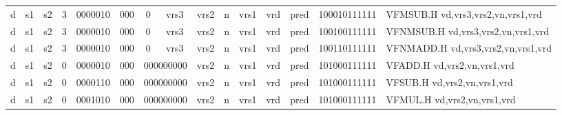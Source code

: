 \begin{landscape}
\begin{table}[p]
\begin{small}
\begin{center}
\begin{tabular}{p{0.08in}@{}p{0.08in}@{}p{0.08in}@{}p{0.08in}@{}p{0.50in}@{}p{0.30in}@{}p{0.08in}@{}p{0.8in}@{}p{0.48in}@{}p{0.32in}@{}p{0.08in}@{}p{0.8in}@{}p{0.8in}@{}p{0.4in}@{}p{0.56in}l}
\multicolumn{1}{|c|}{d} &
\multicolumn{1}{c|}{s1} &
\multicolumn{1}{c|}{s2} &
\multicolumn{1}{c|}{3} &
\multicolumn{1}{c|}{0000010} &
\multicolumn{1}{c|}{000} &
\multicolumn{1}{c|}{0} &
\multicolumn{1}{c|}{vrs3} &
\multicolumn{2}{c|}{vrs2} &
\multicolumn{1}{c|}{n} &
\multicolumn{1}{c|}{vrs1} &
\multicolumn{1}{c|}{vrd} &
\multicolumn{1}{c|}{pred} &
\multicolumn{1}{c|}{100010111111} & VFMSUB.H vd,vrs3,vrs2,vn,vrs1,vrd \\
\cline{1-15}
  

\multicolumn{1}{|c|}{d} &
\multicolumn{1}{c|}{s1} &
\multicolumn{1}{c|}{s2} &
\multicolumn{1}{c|}{3} &
\multicolumn{1}{c|}{0000010} &
\multicolumn{1}{c|}{000} &
\multicolumn{1}{c|}{0} &
\multicolumn{1}{c|}{vrs3} &
\multicolumn{2}{c|}{vrs2} &
\multicolumn{1}{c|}{n} &
\multicolumn{1}{c|}{vrs1} &
\multicolumn{1}{c|}{vrd} &
\multicolumn{1}{c|}{pred} &
\multicolumn{1}{c|}{100100111111} & VFNMSUB.H vd,vrs3,vrs2,vn,vrs1,vrd \\
\cline{1-15}
  

\multicolumn{1}{|c|}{d} &
\multicolumn{1}{c|}{s1} &
\multicolumn{1}{c|}{s2} &
\multicolumn{1}{c|}{3} &
\multicolumn{1}{c|}{0000010} &
\multicolumn{1}{c|}{000} &
\multicolumn{1}{c|}{0} &
\multicolumn{1}{c|}{vrs3} &
\multicolumn{2}{c|}{vrs2} &
\multicolumn{1}{c|}{n} &
\multicolumn{1}{c|}{vrs1} &
\multicolumn{1}{c|}{vrd} &
\multicolumn{1}{c|}{pred} &
\multicolumn{1}{c|}{100110111111} & VFNMADD.H vd,vrs3,vrs2,vn,vrs1,vrd \\
\cline{1-15}
  

\multicolumn{1}{|c|}{d} &
\multicolumn{1}{c|}{s1} &
\multicolumn{1}{c|}{s2} &
\multicolumn{1}{c|}{0} &
\multicolumn{1}{c|}{0000010} &
\multicolumn{1}{c|}{000} &
\multicolumn{2}{c|}{000000000} &
\multicolumn{2}{c|}{vrs2} &
\multicolumn{1}{c|}{n} &
\multicolumn{1}{c|}{vrs1} &
\multicolumn{1}{c|}{vrd} &
\multicolumn{1}{c|}{pred} &
\multicolumn{1}{c|}{101000111111} & VFADD.H vd,vrs2,vn,vrs1,vrd \\
\cline{1-15}
  

\multicolumn{1}{|c|}{d} &
\multicolumn{1}{c|}{s1} &
\multicolumn{1}{c|}{s2} &
\multicolumn{1}{c|}{0} &
\multicolumn{1}{c|}{0000110} &
\multicolumn{1}{c|}{000} &
\multicolumn{2}{c|}{000000000} &
\multicolumn{2}{c|}{vrs2} &
\multicolumn{1}{c|}{n} &
\multicolumn{1}{c|}{vrs1} &
\multicolumn{1}{c|}{vrd} &
\multicolumn{1}{c|}{pred} &
\multicolumn{1}{c|}{101000111111} & VFSUB.H vd,vrs2,vn,vrs1,vrd \\
\cline{1-15}
  

\multicolumn{1}{|c|}{d} &
\multicolumn{1}{c|}{s1} &
\multicolumn{1}{c|}{s2} &
\multicolumn{1}{c|}{0} &
\multicolumn{1}{c|}{0001010} &
\multicolumn{1}{c|}{000} &
\multicolumn{2}{c|}{000000000} &
\multicolumn{2}{c|}{vrs2} &
\multicolumn{1}{c|}{n} &
\multicolumn{1}{c|}{vrs1} &
\multicolumn{1}{c|}{vrd} &
\multicolumn{1}{c|}{pred} &
\multicolumn{1}{c|}{101000111111} & VFMUL.H vd,vrs2,vn,vrs1,vrd \\
\cline{1-15}
  


\end{tabular}
\end{center}
\end{small}
\end{table}
\end{landscape}
